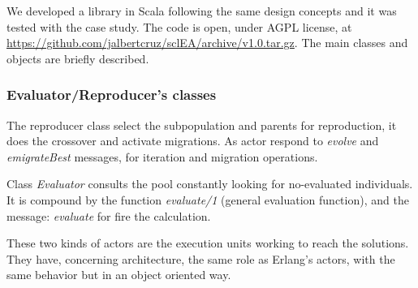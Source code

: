
We developed a library in Scala following the same design concepts and it was tested with the case study. The code is open, under AGPL license, at \url{https://github.com/jalbertcruz/sclEA/archive/v1.0.tar.gz}. The main classes and objects are briefly described.

\subsubsection{Evaluator/Reproducer's classes}

The reproducer class select the subpopulation and parents for reproduction, it does the crossover and activate migrations. As actor respond to {\em evolve} and {\em emigrateBest} messages, for iteration and migration operations.

Class {\em Evaluator} consults the pool constantly looking for no-evaluated individuals. It is compound by the function {\em evaluate/1} (general evaluation function), and the message: {\em evaluate} for fire the calculation.

These two kinds of actors are the execution units working to reach the solutions. They have, concerning architecture, the same role as Erlang’s actors, with the same behavior but in an object oriented way.

